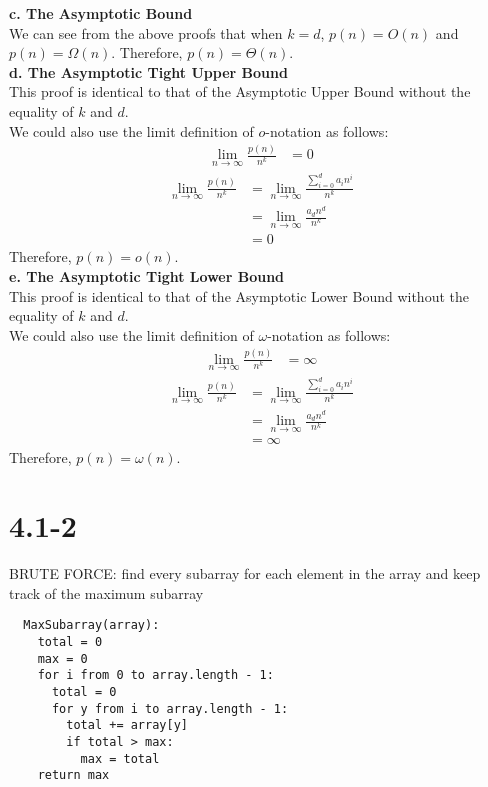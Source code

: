 \documentclass{article}
\begin{document}
{\noindent
\textbf{c. The Asymptotic Bound} \\
We can see from the above proofs that when $k = d$, $p(n) = O(n)$ and $p(n) = \Omega(n)$.
Therefore, $p(n) = \Theta(n)$. \\

\noindent
\textbf{d. The Asymptotic Tight Upper Bound} \\
This proof is identical to that of the Asymptotic Upper Bound without the \\
equality of $k$ and $d$.\\
We could also use the limit definition of $o$-notation as follows: \\
\begin{align*}
  \lim_{n \to \infty} \frac{p(n)}{n^k} &= 0
\end{align*}
\begin{align*}
 \lim_{n \to \infty} \frac{p(n)}{n^k} &= \lim_{n \to \infty} \frac{\sum_{i=0}^{d} a_in^i}{n^k} \\
                                      &= \lim_{n \to \infty} \frac{a_{d}n^{d}}{n^k} \\
                                      &= 0
\end{align*}
Therefore, $p(n) = o(n)$.\\

\noindent
\textbf{e. The Asymptotic Tight Lower Bound} \\
This proof is identical to that of the Asymptotic Lower Bound without the \\
equality of $k$ and $d$.\\
We could also use the limit definition of $\omega$-notation as follows: \\
\begin{align*}
  \lim_{n \to \infty} \frac{p(n)}{n^k} &= \infty
\end{align*}
\begin{align*}
 \lim_{n \to \infty} \frac{p(n)}{n^k} &= \lim_{n \to \infty} \frac{\sum_{i=0}^{d} a_in^i}{n^k} \\
                                      &= \lim_{n \to \infty} \frac{a_{d}n^{d}}{n^k} \\
                                      &= \infty
\end{align*}
Therefore, $p(n) = \omega(n)$.

\section{4.1-2}
BRUTE FORCE: find every subarray for each element in the array and keep
track of the maximum subarray
\begin{verbatim}
  MaxSubarray(array):
    total = 0
    max = 0
    for i from 0 to array.length - 1:
      total = 0
      for y from i to array.length - 1:
        total += array[y]
        if total > max:
          max = total
    return max
\end{verbatim}

}
\end{document}
